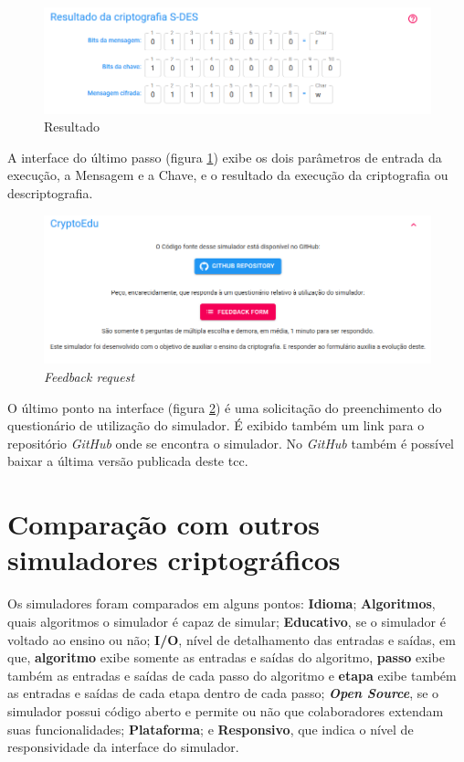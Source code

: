 \begin{figure}[H]
    \centering
    \caption{Resultado}
    \label{fig:uiresult}
    \includegraphics[width=1\linewidth]{UI/UIResult.png}
\end{figure}

A interface do último passo (figura \ref{fig:uiresult}) exibe os dois parâmetros de entrada da execução, a Mensagem e a Chave, e o resultado da execução da criptografia ou descriptografia.

\begin{figure}[H]
    \centering
    \caption{\textit{Feedback request}}
    \label{fig:uifeedback}
    \includegraphics[width=1\linewidth]{UI/UIFeedback.png}
\end{figure}

O último ponto na interface (figura \ref{fig:uifeedback}) é uma solicitação do preenchimento do questionário de utilização do simulador. É exibido também um link para o repositório \textit{GitHub} onde se encontra o simulador. No \textit{GitHub} também é possível baixar a última versão publicada deste \acrshort{tcc}.

\section{Comparação com outros simuladores criptográficos}
Os simuladores foram comparados em alguns pontos: \textbf{Idioma}; \textbf{Algoritmos}, quais algoritmos o simulador é capaz de simular; \textbf{Educativo}, se o simulador é voltado ao ensino ou não; \textbf{I/O}, nível de detalhamento das entradas e saídas, em que, \textbf{algoritmo} exibe somente as entradas e saídas do algoritmo, \textbf{passo} exibe também as entradas e saídas de cada passo do algoritmo e \textbf{etapa} exibe também as entradas e saídas de cada etapa dentro de cada passo; \textbf{\textit{Open Source}}, se o simulador possui código aberto e permite ou não que colaboradores extendam suas funcionalidades; \textbf{Plataforma}; e \textbf{Responsivo}, que indica o nível de responsividade da interface do simulador.

